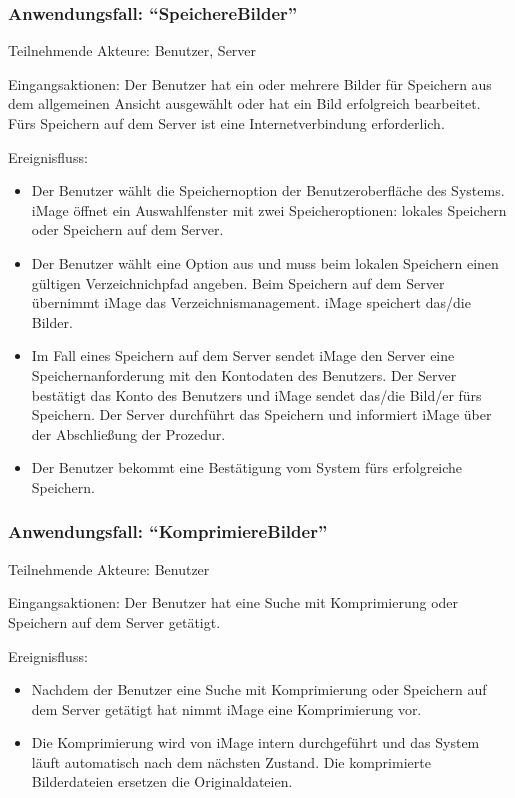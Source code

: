 \documentclass[parskip=full]{scrartcl}
\begin{document}
\subsubsection{Anwendungsfall: "`SpeichereBilder"'}

Teilnehmende Akteure: Benutzer, Server

Eingangsaktionen: Der Benutzer hat ein oder mehrere Bilder für Speichern aus dem allgemeinen Ansicht ausgewählt oder hat ein Bild erfolgreich bearbeitet. Fürs Speichern auf dem Server ist eine Internetverbindung erforderlich.

Ereignisfluss:

\begin{itemize}[nosep]
\item Der Benutzer wählt die Speichernoption der Benutzeroberfläche des Systems. iMage öffnet ein Auswahlfenster mit zwei Speicheroptionen: lokales Speichern oder Speichern auf dem Server.
\item Der Benutzer wählt eine Option aus und muss beim lokalen Speichern einen gültigen Verzeichnichpfad angeben. Beim Speichern auf dem Server übernimmt iMage das Verzeichnismanagement. iMage speichert das/die Bilder.
\item Im Fall eines Speichern auf dem Server sendet iMage den Server eine Speichernanforderung mit den Kontodaten des Benutzers. Der Server bestätigt das Konto des Benutzers und iMage sendet das/die Bild/er fürs Speichern. Der Server durchführt das Speichern und informiert iMage über der Abschließung der Prozedur.
\item Der Benutzer bekommt eine Bestätigung vom System fürs erfolgreiche Speichern.
\end{itemize}

\subsubsection{Anwendungsfall: "`KomprimiereBilder"'}

Teilnehmende Akteure: Benutzer

Eingangsaktionen: Der Benutzer hat eine Suche mit Komprimierung oder Speichern auf dem Server getätigt.

Ereignisfluss:

\begin{itemize}[nosep]
\item Nachdem der Benutzer eine Suche mit Komprimierung oder Speichern auf dem Server getätigt hat nimmt iMage eine Komprimierung vor.
\item Die Komprimierung wird von iMage intern durchgeführt und das System läuft automatisch nach dem nächsten Zustand. Die komprimierte Bilderdateien ersetzen die Originaldateien.
\end{itemize}

%
%
\printnoidxglossaries
\end{document}
